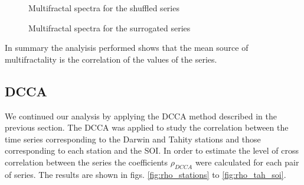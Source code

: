 \documentclass[onecolumn, preprint,aps,amsmath, amssymb, superscriptaddress]{revtex4}
\begin{document}
\begin{figure}
\caption{Multifractal spectra for the shuffled series}
\label{fig:h-hshuff}
\end{figure}

\begin{figure}
\caption{Multifractal spectra for the surrogated series}
\label{fig:h-hsurr}
\end{figure}


In summary the analyisis performed shows that the mean source of multifractality is the correlation of the values of the series.



\subsection{DCCA}
\label{results_dcca}

We continued our analysis by applying the DCCA method described in the previous section. The DCCA was applied to study the correlation between the time series corresponding to the Darwin and Tahity stations and those corresponding to  each station and the SOI. In order to estimate the level of cross correlation between the series the coefficients $\rho_{DCCA}$ were calculated for each pair of series. The results are shown in figs. \ref{fig:rho_stations} to \ref{fig:rho_tah_soi}.
\end{document}
